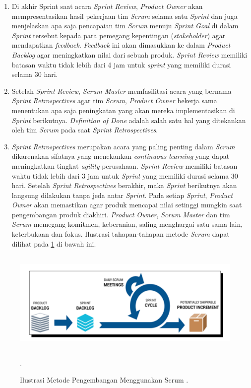 \begin{enumerate}
\item Di akhir Sprint saat acara \textit{Sprint Review}, \textit{Product Owner} akan mempresentasikan hasil pekerjaan tim \textit{Scrum} selama satu \textit{Sprint} dan juga menjelaskan apa saja pencapaian tim \textit{Scrum} menuju \textit{Sprint Goal} di dalam \textit{Sprint} tersebut kepada para pemegang kepentingan (\textit{stakeholder}) agar mendapatkan \textit{feedback}. \textit{Feedback} ini akan dimasukkan ke dalam \textit{Product Backlog} agar meningkatkan nilai dari sebuah produk. \textit{Sprint Review} memiliki batasan waktu tidak lebih dari 4 jam untuk \textit{sprint} yang memiliki durasi selama 30 hari.

\item Setelah \textit{Sprint Review}, \textit{Scrum Master} memfasilitasi acara yang bernama \textit{Sprint Retrospectives} agar tim \textit{Scrum}, \textit{Product Owner} bekerja sama menentukan apa saja peningkatan yang akan mereka implementasikan di \textit{Sprint} berikutnya. \textit{Definition of Done} adalah salah satu hal yang ditekankan oleh tim \textit{Scrum} pada saat \textit{Sprint Retrospectives}.


\newpage
\item \textit{Sprint Retrospectives} merupakan acara yang paling penting dalam \textit{Scrum} dikarenakan sifatnya yang menekankan \textit{continuous learning} yang dapat meningkatkan tingkat \textit{agility} perusahaan. \textit{Sprint Review} memiliki batasan waktu tidak lebih dari 3 jam untuk \textit{Sprint} yang memiliki durasi selama 30 hari. Setelah \textit{Sprint Retrospectives} berakhir, maka \textit{Sprint} berikutnya akan langsung dilakukan tanpa jeda antar \textit{Sprint}. Pada setiap \textit{Sprint}, \textit{Product Owner} akan memastikan agar produk mencapai nilai setinggi mungkin saat pengembangan produk diakhiri. \textit{Product Owner}, \textit{Scrum Master} dan tim \textit{Scrum} memegang komitmen, keberanian, saling menghargai satu sama lain, keterbukaan dan fokus. Ilustrasi tahapan-tahapan metode \textit{Scrum} dapat dilihat pada \ref{img:scrum} di bawah ini.
\end{enumerate}

\begin{figure}[H]
\centering
{\includegraphics [width = 14cm, height= 5cm]{gambar/bab2/Scrum}}
\caption{Ilustrasi Metode Pengembangan Menggunakan Scrum \citep{schwaber2011scrum}.}.
\label{img:scrum}
\end{figure}

